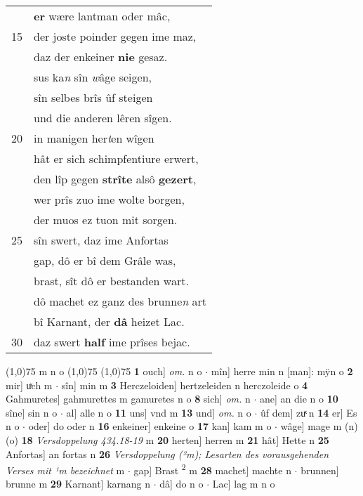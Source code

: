 \documentclass[8pt,a4paper,notitlepage]{article}
\begin{document}
\begin{table}[ht]
\begin{minipage}[t]{0.5\linewidth}
\begin{tabular}{rl}
 & \textbf{er} wære lantman oder mâc,\\ 
15 & der joste poinder gegen ime maz,\\ 
 & daz der enkeiner \textbf{nie} gesaz.\\ 
 & sus ka\textit{n} sîn \textit{w}âge seigen,\\ 
 & sîn selbes brîs ûf steigen\\ 
 & und die anderen lêren sîgen.\\ 
20 & in manigen her\textit{t}en wîgen\\ 
 & hât er sich schimpfentiure erwert,\\ 
 & den lîp gegen \textbf{strîte} alsô \textbf{gezert},\\ 
 & wer prîs zuo ime wolte borgen,\\ 
 & der muos ez tuon mit sorgen.\\ 
25 & sîn swert, daz ime Anfortas\\ 
 & gap, dô er bî dem Grâle was,\\ 
 & brast, sît dô er bestanden wart.\\ 
 & dô machet ez ganz des brunne\textit{n} art\\ 
 & bî Karnant, der \textbf{dâ} heizet Lac.\\ 
30 & daz swert \textbf{half} ime prîses bejac.\\ 
\end{tabular}
\scriptsize
\line(1,0){75} \newline
m n o \newline
\line(1,0){75} \newline
\newline
\line(1,0){75} \newline
\textbf{1} ouch] \textit{om.} n o  $\cdot$ mîn] herre min n [man]: mÿn o \textbf{2} mir] uͯch m  $\cdot$ sîn] min m \textbf{3} Herczeloiden] hertzeleiden n herczoleide o \textbf{4} Gahmuretes] gahmurettes m gamuretes n o \textbf{8} sich] \textit{om.} n  $\cdot$ ane] an die n o \textbf{10} sîne] sin n o  $\cdot$ al] alle n o \textbf{11} uns] vnd m \textbf{13} und] \textit{om.} n o  $\cdot$ ûf dem] zuͯ n \textbf{14} er] Es n o  $\cdot$ oder] do oder n \textbf{16} enkeiner] enkeine o \textbf{17} kan] kam m o  $\cdot$ wâge] mage m (n) (o) \textbf{18} \textit{Versdoppelung 434.18-19} m  \textbf{20} herten] herren m \textbf{21} hât] Hette n \textbf{25} Anfortas] an fortas n \textbf{26} \textit{Versdoppelung (²m); Lesarten des vorausgehenden Verses mit ¹m bezeichnet} m   $\cdot$ gap] Brast \textsuperscript{2}\hspace{-1.3mm} m \textbf{28} machet] machte n  $\cdot$ brunnen] brunne m \textbf{29} Karnant] karnang n  $\cdot$ dâ] do n o  $\cdot$ Lac] lag m n o \newline
\end{minipage}
\end{table}
\end{document}
